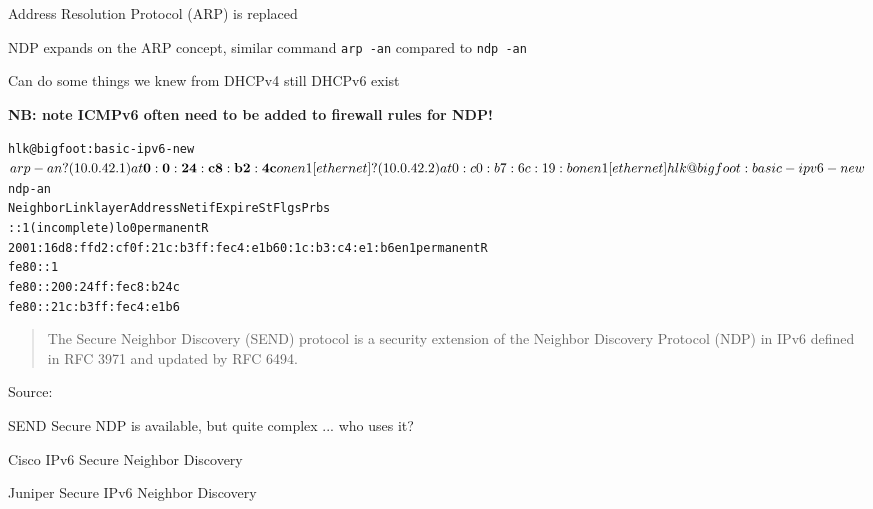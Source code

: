\documentclass[Screen16to9,17pt]{foils}
\begin{document}


\begin{list1}
\item Address Resolution Protocol (ARP) is replaced
\item NDP expands on the ARP concept, similar command \verb+arp -an+ compared to \verb+ndp -an+
\item Can do some things we knew from DHCPv4 still DHCPv6 exist
\item {\bf NB: note ICMPv6 often need to be added to firewall rules for NDP!}
\end{list1}


\begin{alltt}
\small
hlk@bigfoot:basic-ipv6-new$ arp -an
? (10.0.42.1) at{\bf 0:0:24:c8:b2:4c} on en1 [ethernet]
? (10.0.42.2) at 0:c0:b7:6c:19:b on en1 [ethernet]
hlk@bigfoot:basic-ipv6-new$ ndp -an
Neighbor                      Linklayer Address  Netif Expire    St Flgs Prbs
::1                           (incomplete)         lo0 permanent R
2001:16d8:ffd2:cf0f:21c:b3ff:fec4:e1b6 0:1c:b3:c4:e1:b6 en1 permanent R
fe80::1%lo0                   (incomplete)         lo0 permanent R
fe80::200:24ff:fec8:b24c%en1 {\bf 0:0:24:c8:b2:4c}      en1 8h54m51s  S  R
fe80::21c:b3ff:fec4:e1b6%en1  0:1c:b3:c4:e1:b6     en1 permanent R
\end{alltt}








\begin{quote}
The Secure Neighbor Discovery (SEND) protocol is a security extension of the Neighbor Discovery Protocol (NDP) in IPv6 defined in RFC 3971 and updated by RFC 6494.
\end{quote}
Source: 

\begin{list2}
\item SEND Secure NDP is available, but quite complex ... who uses it?
\item Cisco IPv6 Secure Neighbor Discovery\\
\item Juniper Secure IPv6 Neighbor Discovery\\{\footnotesize
{}}
\end{list2}
\end{document}
